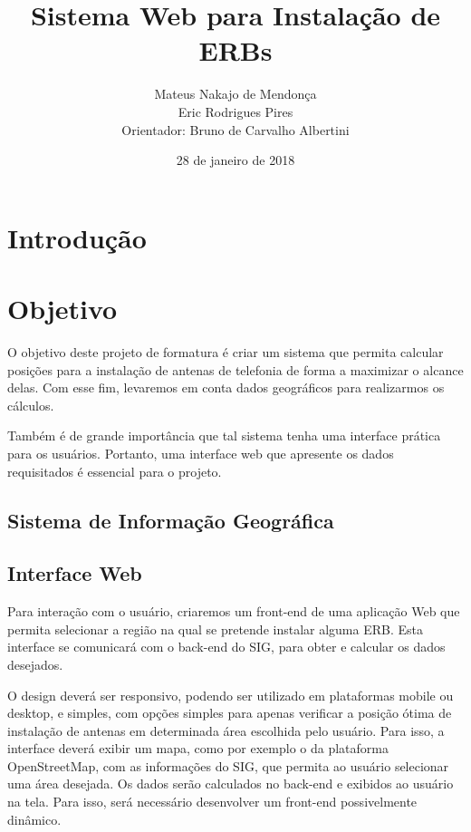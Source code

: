 \documentclass[12pt,a4paper]{article}
\title{Sistema Web para Instalação de ERBs}
\author{Mateus Nakajo de Mendonça  \\
	Eric Rodrigues Pires  \\
    Orientador: Bruno de Carvalho Albertini
	}
\date{28 de janeiro de 2018}
\begin{document}
\maketitle

\begin{abstract}

\lipsum[1]

\end{abstract}

\section{Introdução}

\lipsum[2-3]

\section{Objetivo}

O objetivo deste projeto de formatura é criar um sistema que permita calcular
posições para a instalação de antenas de telefonia de forma a maximizar o
alcance delas. Com esse fim, levaremos em conta dados geográficos para
realizarmos os cálculos.

Também é de grande importância que tal sistema tenha uma interface prática
para os usuários. Portanto, uma interface web que apresente os dados
requisitados é essencial para o projeto.

\subsection{Sistema de Informação Geográfica}

\lipsum[4-5]


\subsection{Interface Web}

Para interação com o usuário, criaremos um front-end de uma aplicação Web que
permita selecionar a região na qual se pretende instalar alguma ERB.
Esta interface se comunicará com o back-end do SIG, para obter e calcular os
dados desejados.

O design deverá ser responsivo, podendo ser utilizado em plataformas mobile
ou desktop, e simples, com opções simples para apenas verificar a posição ótima
de instalação de antenas em determinada área escolhida pelo usuário. Para isso,
a interface deverá exibir um mapa, como por exemplo o da plataforma
OpenStreetMap, com as informações do SIG, que permita ao usuário selecionar uma
área desejada. Os dados serão calculados no back-end e exibidos ao usuário na
tela. Para isso, será necessário desenvolver um front-end possivelmente
dinâmico.
\end{document}
